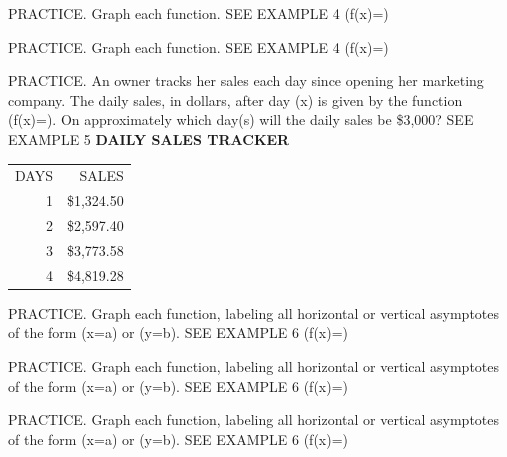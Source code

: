 \documentclass{article}
\newenvironment{practice}[2]{}{}        %
\newcommand{\answer}[1]{}               %
\newcommand{\placeholder}[2]{}          %
\begin{document}
\begin{practice}{24}{1}
PRACTICE. Graph each function. SEE EXAMPLE 4
(f(x)=)
\answer{See back of book.}
\end{practice}
\begin{practice}{25}{1}
PRACTICE. Graph each function. SEE EXAMPLE 4
(f(x)=)
\answer{See back of book.}
\end{practice}
\begin{practice}{26}{2}
PRACTICE. An owner tracks her sales each day since opening her marketing company. The daily sales, in dollars, after day (x) is given by the function (f(x)=). On approximately which day(s) will the daily sales be \$3,000? SEE EXAMPLE 5
\textbf{DAILY SALES TRACKER}
\begin{tabular}{rr}
DAYS & SALES \\
1 & \$1,324.50 \\
2 & \$2,597.40 \\
3 & \$3,773.58 \\
4 & \$4,819.28 \\
\end{tabular}
\answer{day 2 and day 64}
\end{practice}
\begin{practice}{27}{2}
PRACTICE. Graph each function, labeling all horizontal or vertical asymptotes of the form (x=a) or (y=b). SEE EXAMPLE 6
(f(x)=)
\answer{See back of book.}
\end{practice}
\begin{practice}{28}{2}
PRACTICE. Graph each function, labeling all horizontal or vertical asymptotes of the form (x=a) or (y=b). SEE EXAMPLE 6
(f(x)=)
\answer{See graph.}
\placeholder{graph}{Practice28 red (2x-1)/(x^2-3x-10), axes x,y,O, window -10 to10 both, grid2, labels -8,-4,4,8. Dashed blue x=-2,x5,y0 with arrows. Three red branches, six end arrows; middle decreases through x0.5, no marked points.}
\end{practice}
\begin{practice}{29}{2}
PRACTICE. Graph each function, labeling all horizontal or vertical asymptotes of the form (x=a) or (y=b). SEE EXAMPLE 6
(f(x)=)
\answer{See graph.}
\placeholder{graph}{Printed practice29 red graph, axes x,y,O; window -10 to10 both, grid2, labels -8,-4,4,8. Dashed blue y0.5 and x6, red vertical behavior at x about-1.5 and6; three branches and six arrows. Middle branch decreases through x1. The displayed right asymptote is at6.}
\end{practice}
\end{document}
